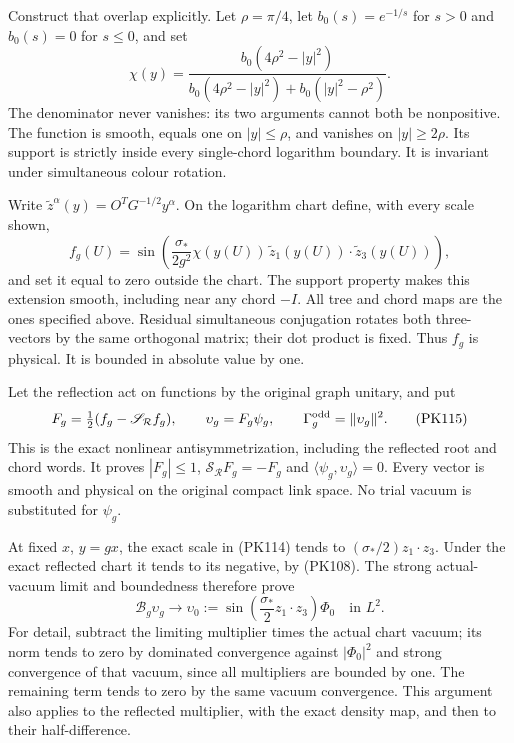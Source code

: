 \documentclass[11pt]{article}
\begin{document}
Construct that overlap explicitly. Let \(\rho=\pi/4\), let
\(b_0(s)=e^{-1/s}\) for \(s>0\) and \(b_0(s)=0\) for \(s\le0\), and set
\[
 \chi(y)=
 \frac{b_0(4\rho^2-|y|^2)}
      {b_0(4\rho^2-|y|^2)+b_0(|y|^2-\rho^2)} .
 \tag{PK113}
\]
The denominator never vanishes: its two arguments cannot both be
nonpositive. The function is smooth, equals one on \(|y|\le\rho\),
and vanishes on \(|y|\ge2\rho\). Its support is strictly inside every
single-chord logarithm boundary. It is invariant under simultaneous
colour rotation.

Write \(\widetilde z^\alpha(y)=O^TG^{-1/2}y^\alpha\).
On the logarithm chart define, with every scale shown,
\[
 f_g(U)=\sin\!\left(
       \frac{\sigma_*}{2g^2}\chi(y(U))\,
              \widetilde z_1(y(U))\cdot\widetilde z_3(y(U))
                    \right),
 \tag{PK114}
\]
and set it equal to zero outside the chart. The support property makes
this extension smooth, including near any chord \(-I\).
All tree and chord maps are the ones specified above.
Residual simultaneous conjugation rotates both three-vectors by the
same orthogonal matrix; their dot product is fixed. Thus \(f_g\) is
physical. It is bounded in absolute value by one.

Let the reflection act on functions by the original graph unitary,
and put
\[
 F_g=\tfrac12(f_g-\mathscr S_{\mathcal R}f_g),\qquad
 \upsilon_g=F_g\psi_g,\qquad
 \Gamma_g^{\rm odd}=\|\upsilon_g\|^2 .
 \tag{PK115}
\]
This is the exact nonlinear antisymmetrization, including the reflected
root and chord words. It proves \(|F_g|\le1\),
\(\mathscr S_{\mathcal R}F_g=-F_g\) and
\(\langle\psi_g,\upsilon_g\rangle=0\). Every vector is smooth and
physical on the original compact link space. No trial vacuum is
substituted for \(\psi_g\).

At fixed \(x\), \(y=gx\), the exact scale in (PK114) tends to
\((\sigma_*/2)z_1\cdot z_3\). Under the exact reflected chart it
tends to its negative, by (PK108). The strong actual-vacuum limit
and boundedness therefore prove
\[
 \mathcal B_g\upsilon_g\longrightarrow
 \upsilon_0:=\sin\!\left(\frac{\sigma_*}{2}z_1\cdot z_3\right)\Phi_0
 \quad\text{in }L^2 .
 \tag{PK116}
\]
For detail, subtract the limiting multiplier times the actual chart
vacuum; its norm tends to zero by dominated convergence against
\(|\Phi_0|^2\) and strong convergence of that vacuum, since all
multipliers are bounded by one. The remaining term tends to zero
by the same vacuum convergence. This argument also applies to the
reflected multiplier, with the exact density map, and then to their
half-difference.
\end{document}
